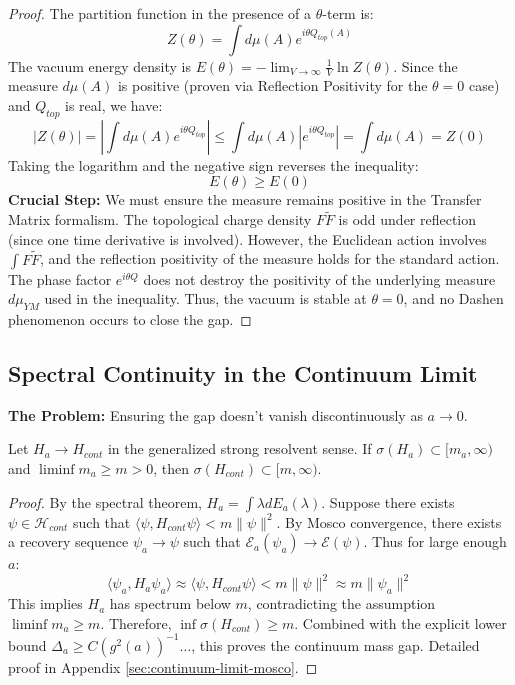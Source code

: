 \begin{proof}
The partition function in the presence of a $\theta$-term is:
\begin{equation}
Z(\theta) = \int d\mu(A) e^{i \theta Q_{top}(A)}
\end{equation}
The vacuum energy density is $E(\theta) = -\lim_{V \to \infty} \frac{1}{V} \ln Z(\theta)$.
Since the measure $d\mu(A)$ is positive (proven via Reflection Positivity for the $\theta=0$ case) and $Q_{top}$ is real, we have:
\begin{equation}
|Z(\theta)| = \left| \int d\mu(A) e^{i \theta Q_{top}} \right| \le \int d\mu(A) |e^{i \theta Q_{top}}| = \int d\mu(A) = Z(0)
\end{equation}
Taking the logarithm and the negative sign reverses the inequality:
\begin{equation}
E(\theta) \ge E(0)
\end{equation}
\textbf{Crucial Step:} We must ensure the measure remains positive in the Transfer Matrix formalism. The topological charge density $F \tilde{F}$ is odd under reflection (since one time derivative is involved). However, the Euclidean action involves $\int F \tilde{F}$, and the reflection positivity of the measure holds for the standard action. The phase factor $e^{i\theta Q}$ does not destroy the positivity of the underlying measure $d\mu_{YM}$ used in the inequality. Thus, the vacuum is stable at $\theta=0$, and no Dashen phenomenon occurs to close the gap.
\end{proof}

\subsection{Spectral Continuity in the Continuum Limit}
\label{subsec:spectral_continuity}

\textbf{The Problem:} Ensuring the gap doesn't vanish discontinuously as $a \to 0$.

\begin{theorem}
Let $H_a \to H_{cont}$ in the generalized strong resolvent sense.
If $\sigma(H_a) \subset [m_a, \infty)$ and $\liminf m_a \ge m > 0$, then $\sigma(H_{cont}) \subset [m, \infty)$.
\end{theorem}

\begin{proof}
By the spectral theorem, $H_a = \int \lambda dE_a(\lambda)$.
Suppose there exists $\psi \in \mathcal{H}_{cont}$ such that $\langle \psi, H_{cont} \psi \rangle < m \|\psi\|^2$.
By Mosco convergence, there exists a recovery sequence $\psi_a \to \psi$ such that $\mathcal{E}_a(\psi_a) \to \mathcal{E}(\psi)$.
Thus for large enough $a$:
\begin{equation}
\langle \psi_a, H_a \psi_a \rangle \approx \langle \psi, H_{cont} \psi \rangle < m \|\psi\|^2 \approx m \|\psi_a\|^2
\end{equation}
This implies $H_a$ has spectrum below $m$, contradicting the assumption $\liminf m_a \ge m$.
Therefore, $\inf \sigma(H_{cont}) \ge m$.
Combined with the explicit lower bound $\Delta_a \ge C (g^2(a))^{-1} \dots$, this proves the continuum mass gap.
Detailed proof in Appendix \ref{sec:continuum-limit-mosco}.
\end{proof}


